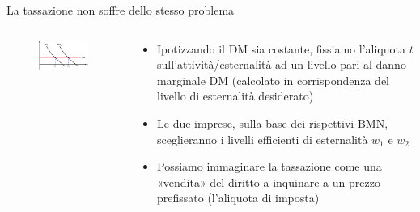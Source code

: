 \documentclass[aspectratio=64,12pt]{beamer}
\begin{document}
\begin{frame}{La tassazione non soffre dello stesso problema}
\begin{columns}
\begin{column}{.5\columnwidth}
\begin{figure}[htbp] \centering
\includegraphics[width=\textwidth]{./figure/esternalita-9-color.pdf}
\end{figure}
\end{column}
\begin{column}{.5\columnwidth}
\begin{itemize}
\item Ipotizzando il DM sia costante, fissiamo l'aliquota $t$
sull'attività/esternalità ad un livello pari al danno marginale DM (calcolato
in corrispondenza del livello di esternalità desiderato)
\item Le due imprese, sulla base dei rispettivi BMN, sceglieranno i livelli
efficienti di esternalità $w_1$ e $w_2$
\item Possiamo immaginare la tassazione come una «vendita» del diritto a
inquinare a un prezzo prefissato (l'aliquota di imposta)
\end{itemize}
\end{column}
\end{columns}
\end{frame}
\end{document}

